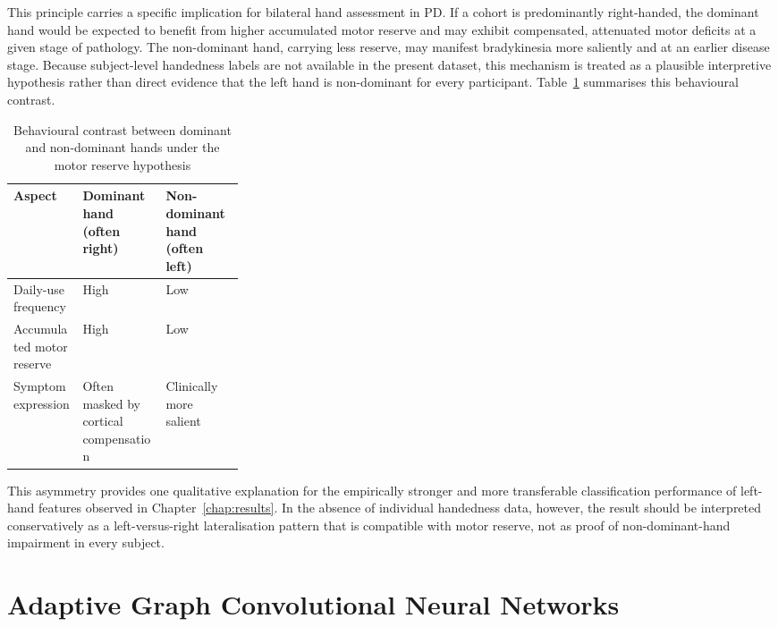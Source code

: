 This principle carries a specific implication for bilateral hand assessment in PD. If a cohort is predominantly right-handed, the dominant hand would be expected to benefit from higher accumulated motor reserve and may exhibit compensated, attenuated motor deficits at a given stage of pathology. The non-dominant hand, carrying less reserve, may manifest bradykinesia more saliently and at an earlier disease stage. Because subject-level handedness labels are not available in the present dataset, this mechanism is treated as a plausible interpretive hypothesis rather than direct evidence that the left hand is non-dominant for every participant. Table~\ref{tab:motor_reserve_summary} summarises this behavioural contrast.

\begin{table}[H]
    \centering
    \caption{Behavioural contrast between dominant and non-dominant hands under the motor reserve hypothesis}
    \label{tab:motor_reserve_summary}
    \small
    \setlength{\tabcolsep}{8pt}
    \begin{tabularx}{\linewidth}{>{\raggedright\arraybackslash}p{0.30\linewidth} >{\raggedright\arraybackslash}X >{\raggedright\arraybackslash}X}
        \hline
        Aspect & Dominant hand (often right) & Non-dominant hand (often left) \\
        \hline
        Daily-use frequency        & High                                  & Low \\
        Accumulated motor reserve  & High                                  & Low \\
        Symptom expression         & Often masked by cortical compensation & Clinically more salient \\
        \hline
    \end{tabularx}
\end{table}

This asymmetry provides one qualitative explanation for the empirically stronger and more transferable classification performance of left-hand features observed in Chapter~\ref{chap:results}. In the absence of individual handedness data, however, the result should be interpreted conservatively as a left-versus-right lateralisation pattern that is compatible with motor reserve, not as proof of non-dominant-hand impairment in every subject.

\section{Adaptive Graph Convolutional Neural Networks}
\label{sec:rw_agcn}

